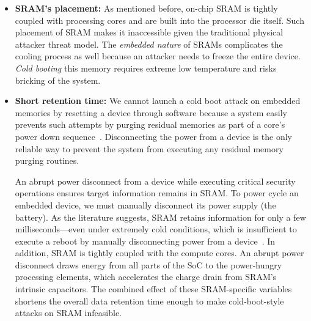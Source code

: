  
 \begin{itemize}
\item \textbf{SRAM's placement:}  As mentioned before, on-chip SRAM is tightly coupled with processing cores and are built into the processor die itself.
Such placement of SRAM makes it inaccessible given the traditional physical attacker threat model. 
The \textit{embedded nature} of SRAMs complicates the cooling process as well because an attacker needs to freeze the entire device.
\textit{Cold booting} this memory requires extreme low temperature and risks bricking of the system. 

\item \textbf{Short retention time:}
We cannot launch a cold boot attack on embedded memories by resetting a device through software because a system easily prevents such attempts by purging residual memories as part of a core's power down sequence~\cite{chan_bootjacker_2008}.
Disconnecting the power from a device is the only reliable way to prevent the system from executing any residual memory purging routines. 

An abrupt power disconnect from a device while executing critical security operations ensures target information remains in SRAM. 
To power cycle an embedded device, we must manually disconnect its power supply (\eg the battery). 
As the literature suggests, SRAM retains information for only a few milliseconds---even under extremely cold conditions, which is insufficient to execute a reboot by manually disconnecting power from a device~\cite{frost_2013}. 
In addition, SRAM is tightly coupled with the compute cores.
An abrupt power disconnect draws energy from all parts of the SoC to the power-hungry processing elements, which accelerates the charge drain from SRAM's intrinsic capacitors.
The combined effect of these SRAM-specific variables shortens the overall data retention time enough to make cold-boot-style attacks on SRAM infeasible. 

 \begin{table}
\centering
    \caption{Errors in d-cache data after a cold boot attack execution in a BCM2711 SoC. We compute a mean error for each core at different temperatures.  The fractional Hamming distance between cache content after power cycle and cache's startup state is $\sim0.10$, indicating no data retention.}
    \label{tab:cold_error}
\end{table}
\end{itemize}
